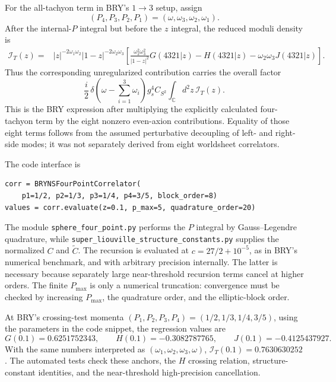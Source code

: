 \documentclass[11pt]{article}
\begin{document}
For the all-tachyon term in BRY's $1\to3$ setup, assign
\begin{equation}
 (P_4,P_3,P_2,P_1)=(\omega,\omega_3,\omega_2,\omega_1).
 \label{eq:bry-four-tachyon-momentum-assignment}
\end{equation}
After the internal-$P$ integral but before the $z$ integral, the reduced
moduli density is
\begin{align}
 \mathcal I_T(z)={}&|z|^{-2\omega_1\omega_2}
 |1-z|^{-2\omega_2\omega_3}
 \left[\frac{\omega_2^2\omega_3^2}{|1-z|^2}G(4321|z)
 -H(4321|z)-\omega_2\omega_3J(4321|z)\right].
 \label{eq:bry-four-tachyon-density}
\end{align}
Thus the corresponding unregularized contribution carries the overall
factor
\begin{equation}
 \frac{i}{2}\,\delta\!\left(\omega-\sum_{i=1}^3\omega_i\right)
 g_s^4C_{S^2}\int_{\mathbb C}d^2z\,\mathcal I_T(z).
 \label{eq:bry-four-tachyon-unregularized-prefactor}
\end{equation}
This is the BRY expression after multiplying the explicitly calculated
four-tachyon term by the eight nonzero even-axion contributions.  Equality of
those eight terms follows from the assumed perturbative decoupling of left-
and right-side modes; it was not separately derived from eight worldsheet
correlators.

The code interface is
\begin{verbatim}
corr = BRYNSFourPointCorrelator(
    p1=1/2, p2=1/3, p3=1/4, p4=3/5, block_order=8)
values = corr.evaluate(z=0.1, p_max=5, quadrature_order=20)
\end{verbatim}
The module \texttt{sphere\_four\_point.py} performs the $P$ integral by
Gauss--Legendre quadrature, while
\texttt{super\_liouville\_structure\_constants.py} supplies the normalized
$C$ and $\widetilde C$.  The recursion is evaluated at
$c=27/2+10^{-5}$, as in BRY's numerical benchmark, and with arbitrary
precision internally.  The latter is necessary because separately large
near-threshold recursion terms cancel at higher orders.  The finite
$P_{\max}$ is only a numerical truncation: convergence must be checked by
increasing $P_{\max}$, the quadrature order, and the elliptic-block order.

At BRY's crossing-test momenta
$(P_1,P_2,P_3,P_4)=(1/2,1/3,1/4,3/5)$, using the parameters in the code
snippet, the regression values are
\begin{equation}
 G(0.1)=0.6251752343,\qquad
 H(0.1)=-0.3082787765,\qquad
 J(0.1)=-0.4125437927.
 \label{eq:bry-four-point-regression-values}
\end{equation}
With the same numbers interpreted as
$(\omega_1,\omega_2,\omega_3,\omega)$,
$\mathcal I_T(0.1)=0.7630630252$.  The automated tests check these anchors,
the $H$ crossing relation, structure-constant identities, and the
near-threshold high-precision cancellation.
\end{document}
